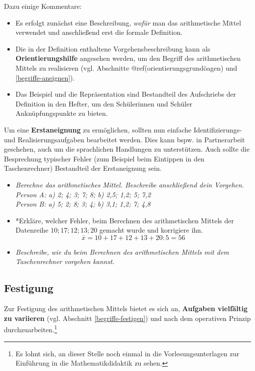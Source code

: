 \documentclass[
]{scrbook}
\providecommand{\tightlist}{%
  \setlength{\itemsep}{0pt}\setlength{\parskip}{0pt}}
\theoremstyle{definition}
\theoremstyle{definition}
\theoremstyle{definition}
\theoremstyle{definition}
\theoremstyle{remark}
\begin{document}
Dazu einige Kommentare:

\begin{itemize}
\tightlist
\item
  Es erfolgt zunächst eine Beschreibung, \emph{wofür} man das arithmetische Mittel verwendet und anschließend erst die formale Definition.\\
\item
  Die in der Definition enthaltene Vorgehensbeschreibung kann als \textbf{Orientierungshilfe} angesehen werden, um den Begriff des arithmetischen Mittels zu realisieren (vgl. Abschnitte @ref(orientierungsgrundöagen) und \ref{begriffe-aneignen}).\\
\item
  Das Beispiel und die Repräsentation sind Bestandteil des Aufschriebs der Definition in den Hefter, um den Schülerinnen und Schüler Anknüpfungspunkte zu bieten.
\end{itemize}

Um eine \textbf{Erstaneignung} zu ermöglichen, sollten nun einfache Identifizierungs- und Realisierungsaufgaben bearbeitet werden. Dies kann bspw. in Partnerarbeit geschehen, auch um die sprachlichen Handlungen zu unterstützen. Auch sollte die Besprechung typischer Fehler (zum Beispiel beim Eintippen in den Taschenrechner) Bestandteil der Erstaneignung sein.

\begin{itemize}
\tightlist
\item
  \emph{Berechne das arithmetisches Mittel. Beschreibe anschließend dein Vorgehen.}\\
  \emph{Person A: a) 2; 4; 3; 7; 8; b) 2,5; 1,2; 5; 7,2}\\
  \emph{Person B: a) 5; 2; 8; 3; 4; b) 3,1; 1,2; 7; 4,8}
\item
  *Erkläre, welcher Fehler, beim Berechnen des arithmetischen Mittels der Datenreihe \(10; 17; 12; 13; 20\) gemacht wurde und korrigiere ihn.
  \[\bar{x} = 10+17+12+13+20:5 = 56\]
\item
  \emph{Beschreibe, wie du beim Berechnen des arithmetischen Mittels mit dem Taschenrechner vorgehen kannst.}
\end{itemize}

\subsection{Festigung}\label{festigung-1}

Zur Festigung des arithmetischen Mittels bietet es sich an, \textbf{Aufgaben vielfältig zu variieren} (vgl. Abschnitt \ref{begriffe-festigen}) und nach dem operativen Prinzip durchzuarbeiten.\footnote{Es lohnt sich, an dieser Stelle noch einmal in die Vorlesungsunterlagen zur Einführung in die Mathematikdidaktik zu sehen.}
\end{document}
